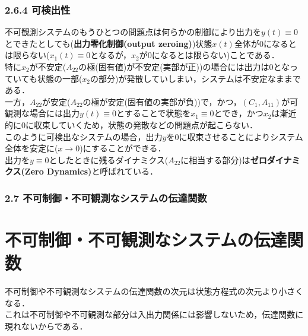 \begin{frame}[t]
\frametitle{2.6.4 可検出性}


不可観測システムのもうひとつの問題点は何らかの制御により出力を$y(t) \equiv 0$とできたとしても({\bf 出力零化制御(output zeroing)})状態$x(t)$全体が$0$になるとは限らない($x_1(t) \equiv 0$となるが，$x_2$が$0$になるとは限らない)ことである．
\\[3mm]

特に$x_2$が不安定($A_{22}$の極(固有値)が不安定(実部が正))の場合には出力は$0$となっていても状態の一部($x_2$の部分)が発散していしまい，システムは不安定なままである．
\\[3mm]

一方，$A_{22}$が安定($A_{22}$の極が安定(固有値の実部が負))で，かつ，$(C_1, A_{11})$が可観測な場合には出力$y(t) \equiv 0$とすることで状態を$x_1 \equiv 0$とでき，かつ$x_2$は漸近的に$0$に収束していくため，状態の発散などの問題点が起こらない．
\\[3mm]

このように可検出なシステムの場合，出力$y$を$0$に収束させることによりシステム全体を安定に($x \rightarrow 0$)にすることができる．
\\[3mm]

出力を$y \equiv 0$としたときに残るダイナミクス($A_{22}$に相当する部分)は{\bf ゼロダイナミクス(Zero Dynamics)}と呼ばれている．



\end{frame}


\begin{frame}[t]
\frametitle{2.7 不可制御・不可観測なシステムの伝達関数}
\section{不可制御・不可観測なシステムの伝達関数}

不可制御や不可観測なシステムの伝達関数の次元は状態方程式の次元より小さくなる．
\\[3mm]

これは不可制御や不可観測な部分は入出力関係には影響しないため，伝達関数に現れないからである．

\end{frame}


